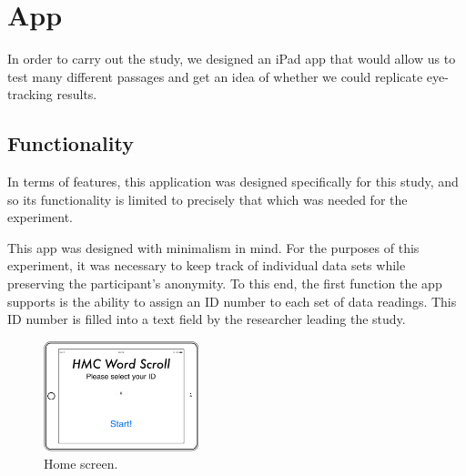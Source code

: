 \documentclass[11pt,letterpaper]{article}
\begin{document}
	\section{App}
	
	In order to carry out the study, we designed an iPad app that would allow us to test many different passages and get an idea of whether we could replicate eye-tracking results.
	
	
	
	\subsection{Functionality}
	
	In terms of features, this application was designed specifically for this study, and so its functionality is limited to precisely that which was needed for the experiment.
	
	This app was designed with minimalism in mind. For the purposes of this experiment, it was necessary to keep track of individual data sets while preserving the participant's anonymity. To this end, the first function the app supports is the ability to assign an ID number to each set of data readings. This ID number is filled into a text field by the researcher leading the study.
	
	\begin{figure}[H]
		\centering
		\includegraphics[width=0.4\textwidth]{splashscreen.png}
		\caption{Home screen.}
	\end{figure}
	
\end{document}
